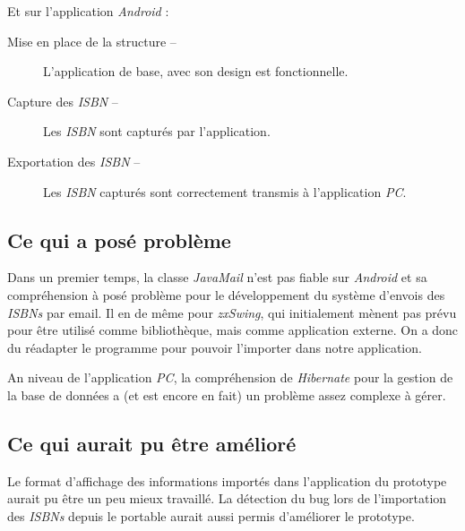 \documentclass[]{support-iutrs} %
\begin{document}
Et sur l'application \emph{Android} : 
\begin{description}
\item [Mise en place de la structure -- ] L'application de base, avec son design est fonctionnelle. 
\item [Capture des \emph{ISBN} -- ] Les \emph{ISBN} sont capturés par l'application. 
\item [Exportation des \emph{ISBN} -- ] Les \emph{ISBN} capturés sont correctement transmis à l'application \emph{PC}. 
\end{description}

\subsection{Ce qui a posé problème} 
Dans un premier temps, la classe \emph{JavaMail} n'est pas fiable sur \emph{Android} et sa compréhension à posé problème pour le développement du système d'envois des \emph{ISBNs} par email.
Il en de même pour \emph{zxSwing}, qui initialement mènent pas prévu pour être utilisé comme bibliothèque, mais comme application externe.
On a donc du réadapter le programme pour pouvoir l'importer dans notre application. 

An niveau de l'application \emph{PC}, la compréhension de \emph{Hibernate} pour la gestion de la base de données a (et est encore en fait) un problème assez complexe à gérer. 

\subsection{Ce qui aurait pu être amélioré}
Le format d'affichage des informations importés dans l'application du prototype aurait pu être un peu mieux travaillé. La détection du bug lors de l'importation des \emph{ISBNs} depuis le portable aurait aussi permis d'améliorer le prototype. 
\end{document}
